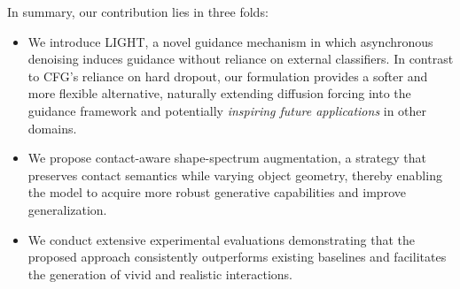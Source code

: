 In summary, our contribution lies in three folds:
\begin{itemize}
    \item We introduce LIGHT, a novel guidance mechanism in which asynchronous denoising induces guidance without reliance on external classifiers. In contrast to CFG’s reliance on hard dropout, our formulation provides a softer and more flexible alternative, naturally extending diffusion forcing into the guidance framework and potentially \textit{inspiring future applications} in other domains.
    \item We propose contact-aware shape-spectrum augmentation, a strategy that preserves contact semantics while varying object geometry, thereby enabling the model to acquire more robust generative capabilities and improve generalization.
    \item We conduct extensive experimental evaluations demonstrating that the proposed approach consistently outperforms existing baselines and facilitates the generation of vivid and realistic interactions.
\end{itemize}